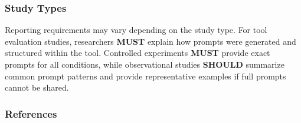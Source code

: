 
\subsubsection{Study Types}
Reporting requirements may vary depending on the study type. For tool evaluation studies, researchers \textbf{MUST} explain how prompts were generated and structured within the tool. Controlled experiments \textbf{MUST} provide exact prompts for all conditions, while observational studies \textbf{SHOULD} summarize common prompt patterns and provide representative examples if full prompts cannot be shared.

\subsubsection{References}





